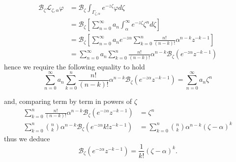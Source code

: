 \documentclass{article}
\theoremstyle{definition}
\newcommand{\laplace}{\mathcal{L}}
\newcommand{\borel}{\mathcal{B}}
\begin{document}
  \begin{align*}
      \borel_\zeta\laplace_{\zeta,\alpha}\varphi&=\borel_\zeta\int_{\Gamma_{\zeta,\alpha}}e^{-z\zeta}\varphi d\zeta\\
      &=\borel_\zeta\left[\sum_{n=0}^{\infty}a_n \int_{\alpha}^{\infty}e^{-z\zeta} \zeta^nd\zeta\right]\\
      &=\borel_\zeta\left[\sum_{n=0}^{\infty}a_n e^{-z\alpha}\sum_{k=0}^n \frac{n!}{(n-k)!}\alpha^{n-k}z^{-k-1}\right]\\
      &=\sum_{n=0}^{\infty}a_n \sum_{k=0}^n \frac{n!}{(n-k)!}\alpha^{n-k}\borel_\zeta(e^{-z\alpha}z^{-k-1})
  \end{align*}
hence we require the following equality to hold  
\[ \sum_{n=0}^{\infty}a_n \sum_{k=0}^n \frac{n!}{(n-k)!}\alpha^{n-k}\borel_\zeta(e^{-z\alpha}z^{-k-1})=\sum_{n=0}^{\infty}a_n \zeta^n\]

and, comparing term by term in powers of $\zeta$ %
  \begin{align*}
      \sum_{k=0}^n \frac{n!}{(n-k)!}\alpha^{n-k}\borel_\zeta(e^{-z\alpha}z^{-k-1})&=\zeta^n\\
      \sum_{k=0}^n {n\choose k} \alpha^{n-k} \borel_\zeta(e^{-z\alpha} k! z^{-k-1})&=\sum_{k=0}^n {n\choose k} \alpha^{n-k}(\zeta-\alpha)^k
  \end{align*}
  thus we deduce \[\borel_\zeta(e^{-z\alpha}z^{-k-1})=\frac{1}{k!}(\zeta-\alpha)^k.\]
\end{document}
